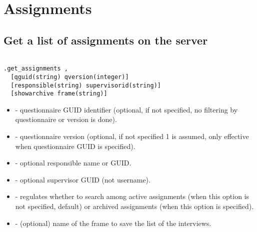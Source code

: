 \section{Assignments}





\subsection{Get a list of assignments on the server}
\begin{lstlisting}[style=CommandLineStyle, showlines=true]

.get_assignments ,
  [qguid(string) qversion(integer)]
  [responsible(string) supervisorid(string)]
  [showarchive frame(string)]

\end{lstlisting}

\optsheader
\begin{itemize}

  \item {} - questionnaire GUID identifier (optional, if not
  specified, no filtering by questionnaire or version is done).

  \item {} - questionnaire version (optional, if not specified 1
  is assumed, only effective when questionnaire GUID is specified).

  \item {} - optional responsible name or GUID.

  \item {} - optional supervisor GUID (not username).

  \item {} - regulates whether to search among active
  assignments (when this option is not specified, default) or archived
  assignments (when this option is specified).

  \item {} - (optional) name of the frame to save the list of the
  interviews.

\end{itemize}

